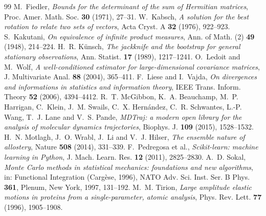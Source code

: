 \documentclass[11pt,reqno]{amsart}
\theoremstyle{plain}
\theoremstyle{definition}
\theoremstyle{remark}
\numberwithin{equation}{section}
\begin{document}
\begin{thebibliography}{99}
 M.~Fiedler, \emph{Bounds for the determinant of the sum of Hermitian matrices}, Proc. Amer. Math. Soc. \textbf{30} (1971), 27--31.
 W.~Kabsch, \emph{A solution for the best rotation to relate two sets of vectors}, Acta Cryst. A \textbf{32} (1976), 922--923.
 S.~Kakutani, \emph{On equivalence of infinite product measures}, Ann. of Math. (2) \textbf{49} (1948), 214--224.
 H.~R. K\"unsch, \emph{The jackknife and the bootstrap for general stationary observations}, Ann. Statist. \textbf{17} (1989), 1217--1241.
 O.~Ledoit and M.~Wolf, \emph{A well-conditioned estimator for large-dimensional covariance matrices}, J. Multivariate Anal. \textbf{88} (2004), 365--411.
 F.~Liese and I.~Vajda, \emph{On divergences and informations in statistics and information theory}, IEEE Trans. Inform. Theory \textbf{52} (2006), 4394--4412.
 R.~T. McGibbon, K.~A. Beauchamp, M.~P. Harrigan, C.~Klein, J.~M. Swails, C.~X. Hern\'andez, C.~R. Schwantes, L.-P. Wang, T.~J. Lane and V.~S. Pande, \emph{MDTraj: a modern open library for the analysis of molecular dynamics trajectories}, Biophys. J. \textbf{109} (2015), 1528--1532.
 H.~N. Motlagh, J.~O. Wrabl, J.~Li and V.~J. Hilser, \emph{The ensemble nature of allostery}, Nature \textbf{508} (2014), 331--339.
 F.~Pedregosa et al., \emph{Scikit-learn: machine learning in Python}, J. Mach. Learn. Res. \textbf{12} (2011), 2825--2830.
 A.~D. Sokal, \emph{Monte Carlo methods in statistical mechanics: foundations and new algorithms}, in: Functional Integration (Carg\`ese, 1996), NATO Adv. Sci. Inst. Ser. B Phys. \textbf{361}, Plenum, New York, 1997, 131--192.
 M.~M. Tirion, \emph{Large amplitude elastic motions in proteins from a single-parameter, atomic analysis}, Phys. Rev. Lett. \textbf{77} (1996), 1905--1908.
\end{thebibliography}
\end{document}
